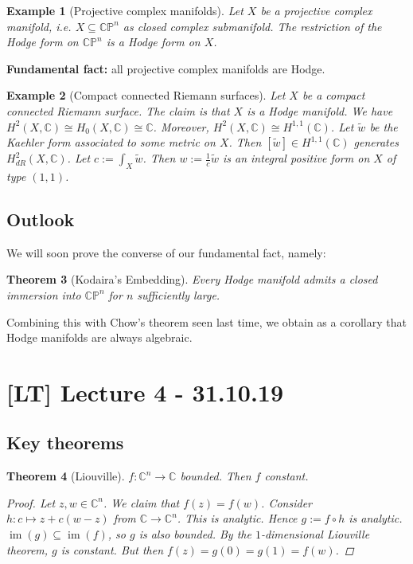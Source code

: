 \documentclass[12pt]{article}
\theoremstyle{darkgreentheorem}
\newtheorem{thm}{Theorem}
\theoremstyle{darkbluedefinition}
\theoremstyle{darkredexample}
\newtheorem{exa}[thm]{Example}
\theoremstyle{remark}
\newcommand{\1}{\mathbbm{1}}
\newcommand{\C}{\mathbb{C}}
\newcommand{\CP}{\mathbb{CP}}
\DeclareMathOperator{\im}{im}
\begin{document}
\begin{exa}[Projective complex manifolds]
    Let $X$ be a projective complex manifold, i.e. $X\subseteq \CP^{n}$ as closed complex submanifold.
    The restriction of the Hodge form on $\CP^{n}$ is a Hodge form on $X$.
\end{exa}

\textbf{Fundamental fact:} all projective complex manifolds are Hodge.

\begin{exa}[Compact connected Riemann surfaces]
    Let $X$ be a compact connected Riemann surface.
    The claim is that $X$ is a Hodge manifold.
    We have $H^{2}(X,\C)\cong H_{0}(X,\C)\cong \C$.
    Moreover, $H^{2}(X,\C)\cong H^{1,1}(\C)$.
    Let $\tilde{w}$ be the Kaehler form associated to some metric on $X$.
    Then $[\tilde{w}]\in H^{1,1}(\C)$ generates $H_{dR}^{2}(X,\C)$.
    Let $c:=\int_{X}\tilde{w}$.
    Then $w:=\frac{1}{c}\tilde{w}$ is an integral positive form on $X$ of type $(1,1)$.
\end{exa}

\subsection{Outlook}

We will soon prove the converse of our fundamental fact, namely:

\begin{thm}[Kodaira's Embedding]
    Every Hodge manifold admits a closed immersion into $\CP^{n}$ for $n$ sufficiently large.
\end{thm}

Combining this with Chow's theorem seen last time, we obtain as a corollary that Hodge manifolds are always algebraic.

\section{[LT] Lecture 4 - 31.10.19}

\subsection{Key theorems}

\begin{thm}[Liouville]
    $f\colon \C^{n}\to \C$ bounded.
    Then $f$ constant.
    \begin{proof}
	Let $z,w\in \C^{n}$.
	We claim that $f(z)=f(w)$.
	Consider $h\colon c\mapsto z+c(w-z)$ from $\C\to \C^{n}$.
	This is analytic.
	Hence $g:=f\circ h$ is analytic.
	$\im(g)\subseteq \im(f)$, so $g$ is also bounded.
	By the $1$-dimensional Liouville theorem, $g$ is constant.
	But then $f(z)=g(0)=g(1)=f(w)$.
    \end{proof}
\end{thm}
\end{document}
